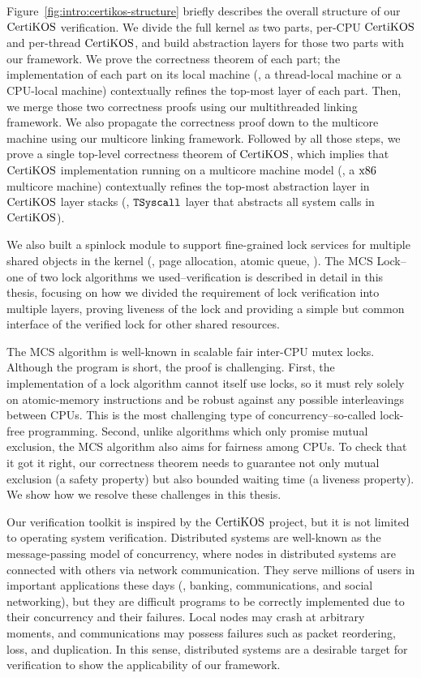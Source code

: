 Figure~\ref{fig:intro:certikos-structure} briefly describes the overall structure of our $\mathrm{CertiKOS}$ verification.
We divide the full kernel as two parts, per-CPU $\mathrm{CertiKOS}$ and per-thread $\mathrm{CertiKOS}$, and build abstraction layers for those two parts with our framework.
We prove the correctness theorem of each part; the implementation of each part on its local machine (\ie, a thread-local machine or a CPU-local machine) contextually refines the top-most layer of each part. 
Then, we merge those two correctness proofs using our multithreaded linking framework. 
We also propagate the correctness proof down to the multicore machine using our multicore linking framework. 
Followed by all those steps, we prove a single top-level correctness theorem of $\mathrm{CertiKOS}$, which implies 
that $\mathrm{CertiKOS}$ implementation running on a multicore machine model (\ie, a $\mathrm{x86}$ multicore machine)  contextually refines the top-most abstraction layer in $\mathrm{CertiKOS}$ layer stacks (\ie, ${{\mathrm{\texttt{TSyscall}}}}$ layer that abstracts all system calls in $\mathrm{CertiKOS}$).




We also built a spinlock module to support fine-grained lock services for multiple shared objects in the kernel 
(\ie, page allocation, atomic queue, \etc).
The MCS Lock--one of two lock algorithms we used--verification is described in detail in this thesis, 
focusing on how we divided the requirement of lock verification into multiple layers, proving
liveness of the lock and providing a simple but common interface of the verified lock for other shared resources.

The MCS algorithm is well-known in scalable fair inter-CPU mutex locks. 
Although the program is short, the proof is challenging. First, the implementation of a lock algorithm cannot itself use locks, 
so it must rely solely on atomic-memory instructions and be robust against any possible interleavings between CPUs. 
This is the most challenging type of concurrency--so-called lock-free programming.
Second, unlike algorithms which only promise mutual exclusion, the MCS algorithm also aims for fairness among CPUs.
To check that it got it right, our correctness theorem needs to guarantee not only mutual exclusion (a safety property) but also bounded waiting time (a liveness property). We show how we resolve these challenges in this thesis.


Our verification toolkit is inspired by the $\mathrm{CertiKOS}$ project, but it is not limited to operating system verification. 
Distributed systems are well-known as the message-passing model of concurrency, where nodes in distributed systems are connected with 
others via network communication. They serve millions of users in important applications
 these days (\ie, banking, communications, and social networking), but they are difficult programs to be correctly implemented 
 due to their concurrency and their failures. Local nodes may crash at arbitrary moments, and communications may possess failures 
 such as packet reordering, loss, and duplication. In this sense, distributed systems are a desirable target for verification to 
 show the applicability of our framework.

